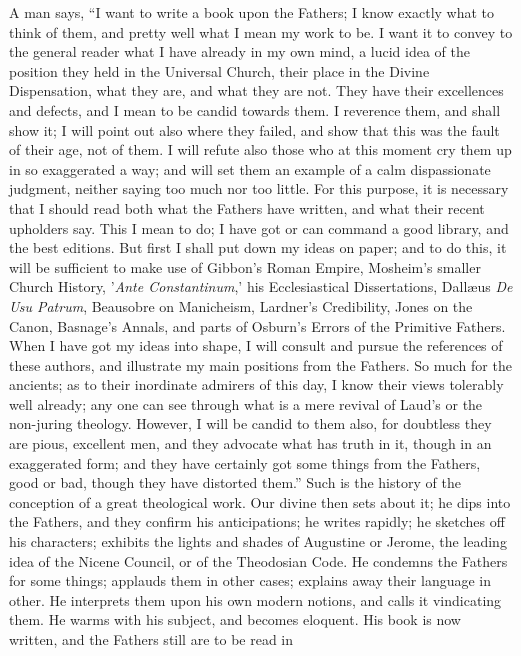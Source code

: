 A man says, ``I want to write a book upon the
Fathers; I know exactly what to think of them, and pretty well what I
mean my work to be. I want it to convey to the general reader what I
have already in my own mind, a lucid idea of the position they held in
the Universal Church, their place in the Divine Dispensation, what
they are, and what they are not. They have their excellences and
defects, and I mean to be candid towards them. I reverence them, and
shall show it; I will point out also where they failed, and show that
this was the fault of their age, not of them. I will refute also those
who at this moment cry them up in so exaggerated a way; and will set
them an example of a calm dispassionate judgment, neither saying too
much nor too little. For this purpose, it is necessary that I should
read both what the Fathers have written, and what their recent
upholders say. This I mean to do; I have got or can command a good
library, and the best editions. But first I shall put down my ideas on
paper; and to do this, it will be sufficient to make use of Gibbon's
Roman Empire, Mosheim's smaller Church History, '\emph{Ante Constantinum},'
his Ecclesiastical Dissertations, Dallæus \emph{De Usu Patrum},
Beausobre on Manicheism, Lardner's Credibility, Jones on the Canon,
Basnage's Annals, and parts of Osburn's Errors of the Primitive
Fathers. When I have got my ideas into shape, I will consult and
pursue the references of these authors, and illustrate my main
positions from the Fathers. So much for the ancients; as to their
inordinate admirers of this day, I know their views tolerably well
already; any one can see through what is a mere revival of Laud's or
the non-juring theology. However, I will be candid to them also, for
doubtless they are pious, excellent men, and they advocate what has
truth in it, though in an exaggerated form; and they have certainly
got some things from the Fathers, good or bad, though they have
distorted them.'' Such is the history of the conception of a great
theological work. Our divine then sets about it; he dips into the
Fathers, and they confirm his anticipations; he writes rapidly; he
sketches off his characters; exhibits the lights and shades of
Augustine or Jerome, the leading idea of the Nicene Council, or
of the Theodosian Code. He condemns the Fathers for some things;
applauds them in other cases; explains away their language in other.
He interprets them upon his own modern notions, and calls it
vindicating them. He warms with his subject, and becomes eloquent. His
book is now written, and the Fathers still are to be read in

